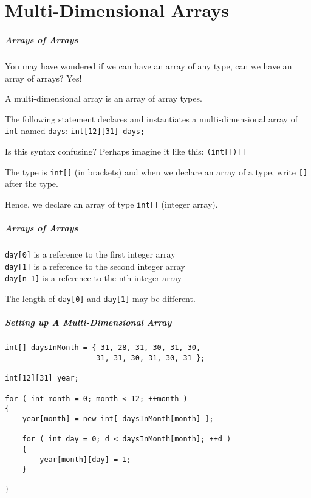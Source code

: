 \part{Multi-Dimensional Arrays}
\begin{frame}\partpage\end{frame}

\begin{frame}
\frametitle{Arrays of Arrays}

You may have wondered if we can have an array of any type, can we have an array of arrays? Yes!

A \alert{multi-dimensional array} is an array of array types.

The following statement declares and instantiates a multi-dimensional array of \texttt{int} named \texttt{days}: \texttt{int[12][31] days;}

Is this syntax confusing? Perhaps imagine it like this: \texttt{(int[])[]}

The type is \texttt{int[]} (in brackets) and when we declare an array of a type, write \texttt{[]} after the type.

Hence, we declare an array of type \texttt{int[]} (integer array).

\end{frame}

\begin{frame}
\frametitle{Arrays of Arrays}

\texttt{day[0]} is a reference to the first integer array\\
\texttt{day[1]} is a reference to the second integer array\\
\texttt{day[n-1]} is a reference to the nth integer array


The length of \texttt{day[0]} and \texttt{day[1]} may be different.

\end{frame}

\begin{frame}[fragile]
\frametitle{Setting up A Multi-Dimensional Array}

\begin{verbatim}
int[] daysInMonth = { 31, 28, 31, 30, 31, 30, 
                     31, 31, 30, 31, 30, 31 };

int[12][31] year;

for ( int month = 0; month < 12; ++month )
{
    year[month] = new int[ daysInMonth[month] ];
	
    for ( int day = 0; d < daysInMonth[month]; ++d )
    {
        year[month][day] = 1;
    }

}
\end{verbatim}

\end{frame}

